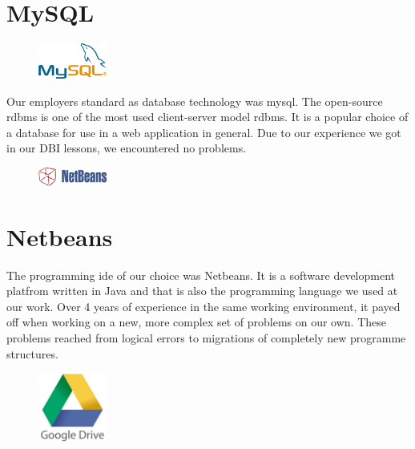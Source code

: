 \section{MySQL}
\begin{figure}
  \begin{center}
    \includegraphics[width=0.2\textwidth] {bilder/MySQL}
  \end{center}
\end{figure}
Our employers standard as database technology was \gls{mysql}. The open-source \gls{rdbms} is one of the most used client-server model \gls{rdbms}. It is a popular choice of a database for use in a web application in general. Due to our experience we got in our DBI lessons, we encountered no problems.

\begin{figure}
  \begin{center}
    \includegraphics[width=0.2\textwidth] {bilder/NetBeans}
  \end{center}
\end{figure}
\section{Netbeans}
The programming \gls{ide} of our choice was Netbeans. It is a software development platfrom written in Java and that is also the programming language we used at our work. Over 4 years of experience in the same working environment, it payed off when working on a new, more complex set of problems on our own. These problems reached from logical errors to migrations of completely new programme structures. 

\begin{figure}
  \begin{center}
    \includegraphics[width=0.2\textwidth] {bilder/googledrive}
  \end{center}
\end{figure}
